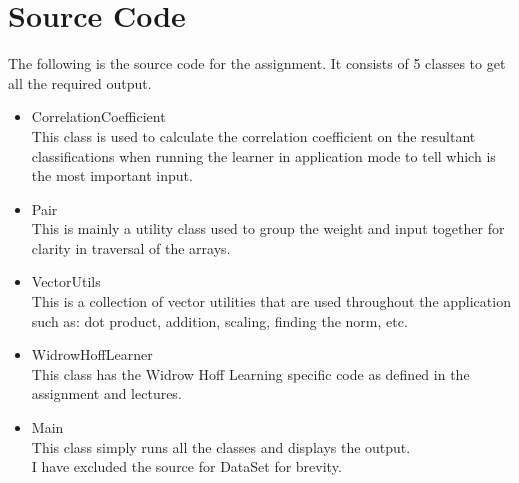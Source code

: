 \section{ Source Code }
The following is the source code for the assignment.  It consists of 5 classes to get all the required output. 
\begin{itemize}
	\item CorrelationCoefficient \\
		This class is used to calculate the correlation coefficient on the resultant classifications when running the learner in application mode to tell which is the most important input.
	\item Pair \\
		This is mainly a utility class used to group the weight and input together for clarity in traversal of the arrays.
	\item VectorUtils \\
		This is a collection of vector utilities that are used throughout the application such as: dot product, addition, scaling, finding the norm, etc.
	\item WidrowHoffLearner \\
		This class has the Widrow Hoff Learning specific code as defined in the assignment and lectures.
	\item Main \\
		This class simply runs all the classes and displays the output. \\
		
		I have excluded the source for DataSet for brevity.
\end{itemize}
